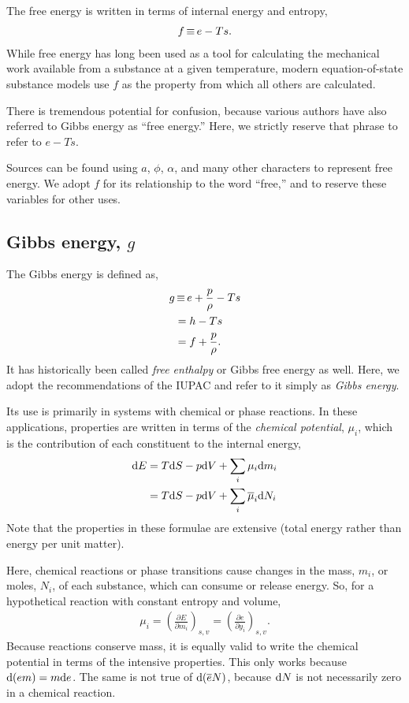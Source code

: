 The free energy is written in terms of internal energy and entropy,
\begin{align}
f \operatorname*{\equiv} e - Ts \label{eqn:intro:f}.
\end{align}
While free energy has long been used as a tool for calculating the mechanical work available from a substance at a given temperature, modern equation-of-state substance models use $f$ as the property from which all others are calculated.

There is tremendous potential for confusion, because various authors have also referred to Gibbs energy as ``free energy.''  Here, we strictly reserve that phrase to refer to $e - Ts$.

Sources can be found using $a$, $\phi$, $\alpha$, and many other characters to represent free energy.  We adopt $f$ for its relationship to the word ``free,'' and to reserve these variables for other uses.


\subsection{Gibbs energy, $g$}\label{sec:intro:g}

The Gibbs energy is defined as,
\begin{align}
g &\operatorname*{\equiv} e + \frac{p}{\rho} - Ts\label{eqn:intro:g}\\
 &=  h - Ts\nonumber\\
 &= f + \frac{p}{\rho}\nonumber.
\end{align}
It has historically been called \emph{free enthalpy} or Gibbs free energy as well.  Here, we adopt the recommendations of the IUPAC and refer to it simply as \emph{Gibbs energy}.

Its use is primarily in systems with chemical or phase reactions.  In these applications, properties are written in terms of the \emph{chemical potential}, $\mu_i$, which is the contribution of each constituent to the internal energy,
\begin{align*}
\mathrm{d} E &= T \mathrm{d} S - p \mathrm{d} V + \sum_i \mu_i \mathrm{d} m_i\\
&= T \mathrm{d} S - p \mathrm{d} V + \sum_i \overline{\mu}_i \mathrm{d} N_i
\end{align*}
Note that the properties in these formulae are extensive (total energy rather than energy per unit matter).  

Here, chemical reactions or phase transitions cause changes in the mass, $m_i$, or moles, $N_i$, of each substance, which can consume or release energy.  So, for a hypothetical reaction with constant entropy and volume,
\begin{align}
\mu_i = \left(\frac{\partial E}{\partial m_i}\right)_{s,v} = \left(\frac{\partial e}{\partial y_i}\right)_{s,v}.
\end{align}
Because reactions conserve mass, it is equally valid to write the chemical potential in terms of the intensive properties.  This only works because $\mathrm{d}(e m) = m\mathrm{d} e$.  The same is not true of $\mathrm{d}(\overline{e} N)$, because $\mathrm{d} N$ is not necessarily zero in a chemical reaction.

